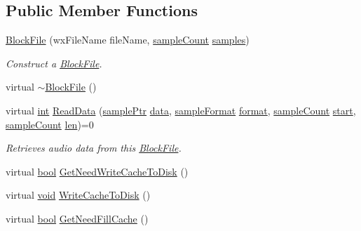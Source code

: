 \subsection*{Public Member Functions}
\begin{DoxyCompactItemize}
\item 
\hyperlink{class_block_file_a26e78f672ba0d663668b5aa7e7f7902b}{Block\+File} (wx\+File\+Name file\+Name, \hyperlink{include_2audacity_2_types_8h_afa427e1f521ea5ec12d054e8bd4d0f71}{sample\+Count} \hyperlink{test__w__saw8_8c_a54185623a5a093f671a73e5fba6197a1}{samples})
\begin{DoxyCompactList}\small\item\em Construct a \hyperlink{class_block_file}{Block\+File}. \end{DoxyCompactList}\item 
virtual \hyperlink{class_block_file_ac6dd550c49ac5c86d7e8c13bbedc76e6}{$\sim$\+Block\+File} ()
\item 
virtual \hyperlink{xmltok_8h_a5a0d4a5641ce434f1d23533f2b2e6653}{int} \hyperlink{class_block_file_ad1355b9c8421a6f1a6b6d8cf3d3f073e}{Read\+Data} (\hyperlink{include_2audacity_2_types_8h_aaafb46d1caf7c79262fec96b577215fe}{sample\+Ptr} \hyperlink{lib_2expat_8h_ac39e72a1de1cb50dbdc54b08d0432a24}{data}, \hyperlink{include_2audacity_2_types_8h_a9938d2e2f6adef23e745cd80ef379792}{sample\+Format} \hyperlink{_export_p_c_m_8cpp_a317afff57d87a89158c2b038d37b2b08}{format}, \hyperlink{include_2audacity_2_types_8h_afa427e1f521ea5ec12d054e8bd4d0f71}{sample\+Count} \hyperlink{seqread_8c_ac503262ae470564980711da4f78b1181}{start}, \hyperlink{include_2audacity_2_types_8h_afa427e1f521ea5ec12d054e8bd4d0f71}{sample\+Count} \hyperlink{lib_2expat_8h_af86d325fecfc8f47b61fbf5a5146f582}{len})=0
\begin{DoxyCompactList}\small\item\em Retrieves audio data from this \hyperlink{class_block_file}{Block\+File}. \end{DoxyCompactList}\item 
virtual \hyperlink{mac_2config_2i386_2lib-src_2libsoxr_2soxr-config_8h_abb452686968e48b67397da5f97445f5b}{bool} \hyperlink{class_block_file_aa01d73c1d5f1951e0ff571f498e902c2}{Get\+Need\+Write\+Cache\+To\+Disk} ()
\item 
virtual \hyperlink{sound_8c_ae35f5844602719cf66324f4de2a658b3}{void} \hyperlink{class_block_file_a037faa0473e04e4c21a3c96fe274b02f}{Write\+Cache\+To\+Disk} ()
\item 
virtual \hyperlink{mac_2config_2i386_2lib-src_2libsoxr_2soxr-config_8h_abb452686968e48b67397da5f97445f5b}{bool} \hyperlink{class_block_file_a66f977ae0fc5cf2a58ecc359d8464b98}{Get\+Need\+Fill\+Cache} ()

\end{DoxyCompactItemize}
